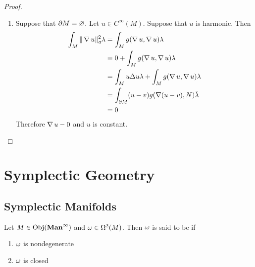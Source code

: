 \documentclass{book}
\begin{document}
\begin{proof}
\begin{enumerate}
\begin{enumerate}
			\item Suppose that $\partial M = \varnothing$. Let $u \in C^{\infty}(M)$. Suppose that $u$ is harmonic. Then
			\begin{align*}
				\int_M \|\operatorname{\nabla} u\|_g^2 \lambda 
				& = \int_M g(\operatorname{\nabla} u, \operatorname{\nabla} u) \lambda \\
				& = 0 + \int_M g(\operatorname{\nabla} u, \operatorname{\nabla} u) \lambda \\
				& = \int_{M} u \Delta u \lambda + \int_M g(\operatorname{\nabla} u, \operatorname{\nabla} u) \lambda \\
				& = \int_{\partial M} (u-v) g(\operatorname{\nabla} (u-v), N) \tilde{\lambda} \\
				& = 0
			\end{align*}
			Therefore $\operatorname{\nabla} u - 0$ and $u$ is constant.
		\end{enumerate}
	\end{enumerate}
\end{proof}



















	\newpage
	\chapter{Symplectic Geometry}
	
	
	
	
	
	
	
	
	
	
	
	
	
	
	
	
	
	
	
	
	
	
	
	
	
	
	
	\newpage
	\section{Symplectic Manifolds}
	
	\begin{defn}
		Let $M \in \operatorname{Obj}(\operatorname*{\text{\textbf{Man}}^{\infty}})$ and $\omega \in \Omega^2(M)$. Then $\omega$ is said to be  if 
		\begin{enumerate}
			\item $\omega$ is nondegenerate
			\item $\omega$ is closed
		\end{enumerate} 
	\end{defn}
	
\end{document}
